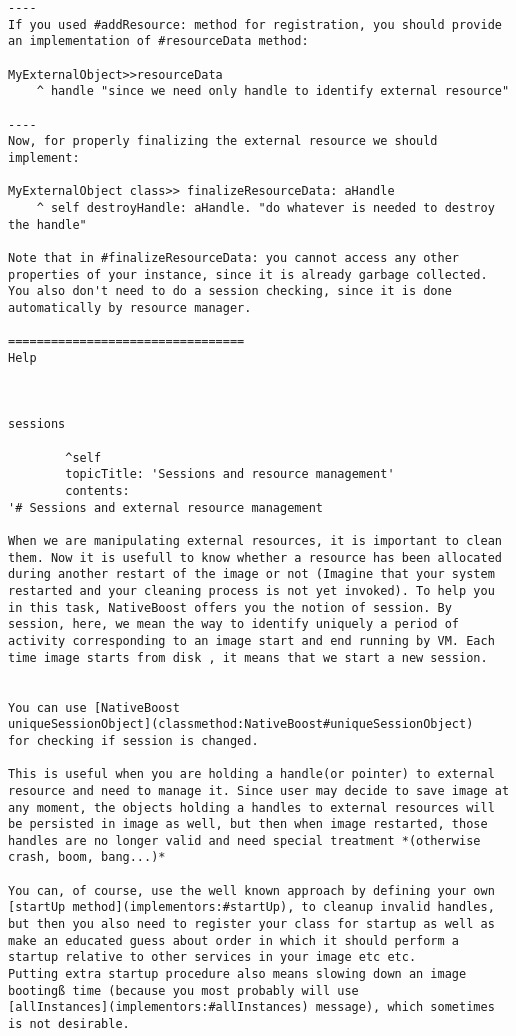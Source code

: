 \documentclass[a4paper,10pt,twoside]{book}
\begin{document}
\begin{verbatim}
----
If you used #addResource: method for registration, you should provide
an implementation of #resourceData method:

MyExternalObject>>resourceData
	^ handle "since we need only handle to identify external resource"

----	
Now, for properly finalizing the external resource we should implement:

MyExternalObject class>> finalizeResourceData: aHandle
	^ self destroyHandle: aHandle. "do whatever is needed to destroy the handle"

Note that in #finalizeResourceData: you cannot access any other
properties of your instance, since it is already garbage collected.
You also don't need to do a session checking, since it is done
automatically by resource manager.

=================================
Help



sessions

		^self
		topicTitle: 'Sessions and resource management'
		contents:
'# Sessions and external resource management

When we are manipulating external resources, it is important to clean
them. Now it is usefull to know whether a resource has been allocated
during another restart of the image or not (Imagine that your system
restarted and your cleaning process is not yet invoked). To help you
in this task, NativeBoost offers you the notion of session. By
session, here, we mean the way to identify uniquely a period of
activity corresponding to an image start and end running by VM. Each
time image starts from disk , it means that we start a new session.


You can use [NativeBoost
uniqueSessionObject](classmethod:NativeBoost#uniqueSessionObject)
for checking if session is changed.

This is useful when you are holding a handle(or pointer) to external
resource and need to manage it. Since user may decide to save image at
any moment, the objects holding a handles to external resources will
be persisted in image as well, but then when image restarted, those
handles are no longer valid and need special treatment *(otherwise
crash, boom, bang...)*

You can, of course, use the well known approach by defining your own
[startUp method](implementors:#startUp), to cleanup invalid handles,
but then you also need to register your class for startup as well as
make an educated guess about order in which it should perform a
startup relative to other services in your image etc etc.
Putting extra startup procedure also means slowing down an image
bootingß time (because you most probably will use
[allInstances](implementors:#allInstances) message), which sometimes
is not desirable.


\end{verbatim}
\end{document}

